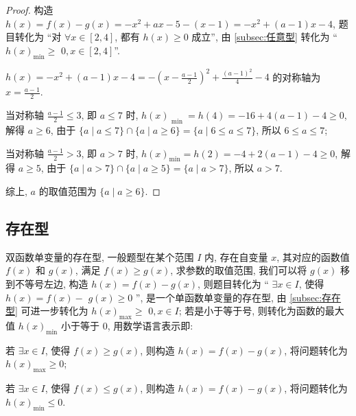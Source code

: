 \begin{proof}
  构造 \(h(x)  = f(x)  -g(x)  =  -{x}^{2} + {ax} -5 -\left( {x -1}\right)  =  -{x}^{2} + \left( {a -1}\right) x -4\), 题目转化为 “对 \(\forall x \in  \left\lbrack  {2, 4}\right\rbrack\), 都有 \(h(x)  \geq  0\) 成立”, 由 \ref{subsec:任意型} 转化为 “\(h{(x) }_{\min } \geq\)  \(0, x \in  {\left\lbrack  2, 4\right\rbrack  }\)”.

\(h(x)  =  -{x}^{2} + \left( {a -1}\right) x -4 =  -{\left( x -\frac{a -1}{2}\right) }^{2} + \frac{{\left( a -1\right) }^{2}}{4} -4\) 的对称轴为 \(x = \frac{a -1}{2}\).

当对称轴 \(\frac{a -1}{2} \leq  3\), 即 \(a \leq  7\) 时, \(h{(x) }_{\text{ min }} = h\left( 4\right)  =  -{16} + 4\left( {a -1}\right)  -4 \geq  0\), 解得 \(a \geq  6\), 由于 \(\{ a \mid  a \leq  7\}  \cap  \{ a \mid  a \geq  6\}  = \{ a \mid  6 \leq  a \leq  7\}\), 所以 \(6 \leq  a \leq  7\);

当对称轴 \(\frac{a -1}{2} > 3\), 即 \(a > 7\) 时, \(h{(x) }_{\min } = h\left( 2\right)  =  -4 + 2\left( {a -1}\right)  -4 \geq  0\), 解得 \(a \geq  5\), 由于 \(\{ a \mid  a > 7\}  \cap  \{ a \mid  a \geq  5\}  = \{ a \mid  a > 7\}\), 所以 \(a > 7\).

综上, \(a\) 的取值范围为 \(\{ a \mid  a \geq  6\}\).
\end{proof}

\subsection{存在型}\label{subsec:2.3存在型}
双函数单变量的存在型, 一般题型在某个范围 \(I\) 内, 存在自变量 \(x\), 其对应的函数值 \(f(x)\) 和 \(g(x)\), 满足 \(f(x)  \geq  g(x)\), 求参数的取值范围, 我们可以将 \(g(x)\) 移到不等号左边, 构造 \(h(x)  = f(x)  -g(x)\), 则题目转化为 “ \(\exists x \in  I\), 使得 \(h(x)  = f(x)  -\)  \(g(x)  \geq  0\) ”, 是一个单函数单变量的存在型, 由 \ref{subsec:存在型} 可进一步转化为 \(h{(x) }_{\max } \geq\)  \(0, x \in  I\); 若是小于等于号, 则转化为函数的最大值 \(h{(x) }_{\min }\) 小于等于 \(0\), 用数学语言表示即:

\begin{type}\label{type:13}
  若 \(\exists x \in  I\), 使得 \(f(x)  \geq  g(x)\), 则构造 \(h(x)  = f(x)  -g(x)\), 将问题转化为 \(h{(x) }_{\max } \geq  0\);
\end{type}

\begin{type}\label{type:14}
  若 \(\exists x \in  I\), 使得 \(f(x)  \leq  g(x)\), 则构造 \(h(x)  = f(x)  -g(x)\), 将问题转化为 \(h{(x) }_{\min } \leq  0\).
\end{type}

